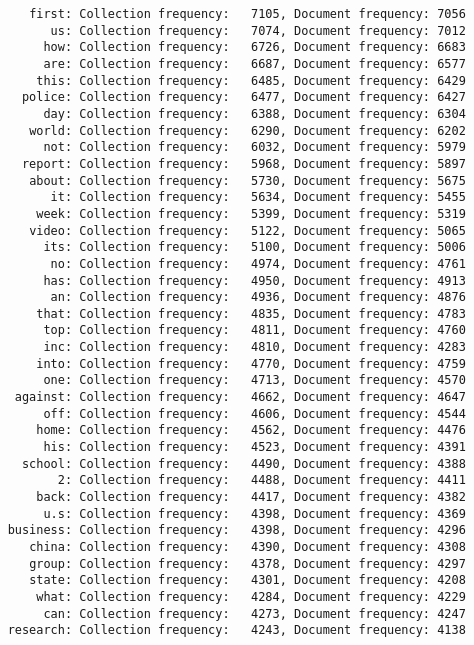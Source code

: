 \documentclass{article}
\begin{document}
\begin{verbatim}
       first: Collection frequency:   7105, Document frequency: 7056
          us: Collection frequency:   7074, Document frequency: 7012
         how: Collection frequency:   6726, Document frequency: 6683
         are: Collection frequency:   6687, Document frequency: 6577
        this: Collection frequency:   6485, Document frequency: 6429
      police: Collection frequency:   6477, Document frequency: 6427
         day: Collection frequency:   6388, Document frequency: 6304
       world: Collection frequency:   6290, Document frequency: 6202
         not: Collection frequency:   6032, Document frequency: 5979
      report: Collection frequency:   5968, Document frequency: 5897
       about: Collection frequency:   5730, Document frequency: 5675
          it: Collection frequency:   5634, Document frequency: 5455
        week: Collection frequency:   5399, Document frequency: 5319
       video: Collection frequency:   5122, Document frequency: 5065
         its: Collection frequency:   5100, Document frequency: 5006
          no: Collection frequency:   4974, Document frequency: 4761
         has: Collection frequency:   4950, Document frequency: 4913
          an: Collection frequency:   4936, Document frequency: 4876
        that: Collection frequency:   4835, Document frequency: 4783
         top: Collection frequency:   4811, Document frequency: 4760
         inc: Collection frequency:   4810, Document frequency: 4283
        into: Collection frequency:   4770, Document frequency: 4759
         one: Collection frequency:   4713, Document frequency: 4570
     against: Collection frequency:   4662, Document frequency: 4647
         off: Collection frequency:   4606, Document frequency: 4544
        home: Collection frequency:   4562, Document frequency: 4476
         his: Collection frequency:   4523, Document frequency: 4391
      school: Collection frequency:   4490, Document frequency: 4388
           2: Collection frequency:   4488, Document frequency: 4411
        back: Collection frequency:   4417, Document frequency: 4382
         u.s: Collection frequency:   4398, Document frequency: 4369
    business: Collection frequency:   4398, Document frequency: 4296
       china: Collection frequency:   4390, Document frequency: 4308
       group: Collection frequency:   4378, Document frequency: 4297
       state: Collection frequency:   4301, Document frequency: 4208
        what: Collection frequency:   4284, Document frequency: 4229
         can: Collection frequency:   4273, Document frequency: 4247
    research: Collection frequency:   4243, Document frequency: 4138

\end{verbatim}
\end{document}

